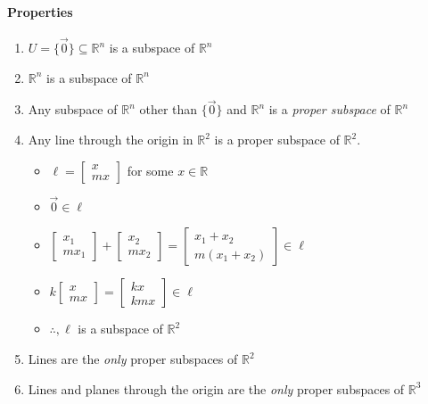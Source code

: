 \paragraph*{Properties}
\begin{enumerate}
    \item $U = \{ \vec{0} \} \subseteq \mathbb{R}^n$ is a subspace of $\mathbb{R}^n$
    \item $\mathbb{R}^n$ is a subspace of $\mathbb{R}^n$
    \item Any subspace of $\mathbb{R}^n$ other than $\{ \vec{0} \}$ and $\mathbb{R}^n$ is a \emph{proper subspace} of $\mathbb{R}^n$
    \item Any line through the origin in $\mathbb{R}^2$ is a proper subspace of $\mathbb{R}^2$.\\
    \begin{itemize}
        \item $\ell = \begin{bmatrix}
            x \\
            mx
        \end{bmatrix}$ for some $x \in \mathbb{R}$
        \item $\vec{0} \in \ell$
        \item $\begin{bmatrix}
            x_1 \\
            mx_1
        \end{bmatrix} + \begin{bmatrix}
            x_2 \\
            mx_2
        \end{bmatrix} = \begin{bmatrix}
            x_1 + x_2 \\
            m(x_1 + x_2)
        \end{bmatrix} \in \ell$
        \item $k \begin{bmatrix}
            x \\
            mx
        \end{bmatrix} = \begin{bmatrix}
            kx \\
            kmx
        \end{bmatrix} \in \ell$
        \item $\therefore, \ell$ is a subspace of $\mathbb{R}^2$
    \end{itemize}
    \item Lines are the \emph{only} proper subspaces of $\mathbb{R}^2$
    \item Lines and planes through the origin are the \emph{only} proper subspaces of $\mathbb{R}^3$
\end{enumerate}

